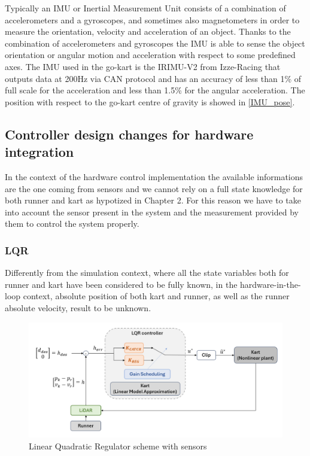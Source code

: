\documentclass[a4paper,12pt,oneside]{book}
\begin{document}
Typically an IMU or Inertial Measurement Unit consists of a combination of accelerometers and a gyroscopes, and sometimes also magnetometers in order to measure the orientation, velocity and acceleration of an object.
Thanks to the combination of accelerometers and gyroscopes the IMU is able to sense the object orientation or angular motion and acceleration with respect to some predefined axes.
The IMU used in the go-kart is the IRIMU-V2 from Izze-Racing that outputs data at 200Hz via CAN protocol and has an accuracy of less than 1\% of full scale for the acceleration and less than 1.5\% for the angular acceleration.
The position with respect to the go-kart centre of gravity is showed in \ref{IMU_pose}.


\subsection{Controller design changes for hardware integration}
In the context of the hardware control implementation the available informations are the one coming from sensors and we cannot rely on a full state knowledge for both runner and kart as hypotized in Chapter 2.
For this reason we have to take into account the sensor present in the system and the measurement provided by them to control the system properly. 

\subsubsection*{LQR}
Differently from the simulation context, where all the state variables both for runner and kart have been considered to be fully known, in the hardware-in-the-loop context, absolute position of both kart and runner, as well as the runner absolute velocity, result to be unknown.

\begin{figure}
	\centering
	\includegraphics[width=1.0\textwidth]{LQR_hard_scheme.png}
	\caption{Linear Quadratic Regulator scheme with sensors}
	\label{image:LQR_hard_scheme}
\end{figure}
\end{document}

